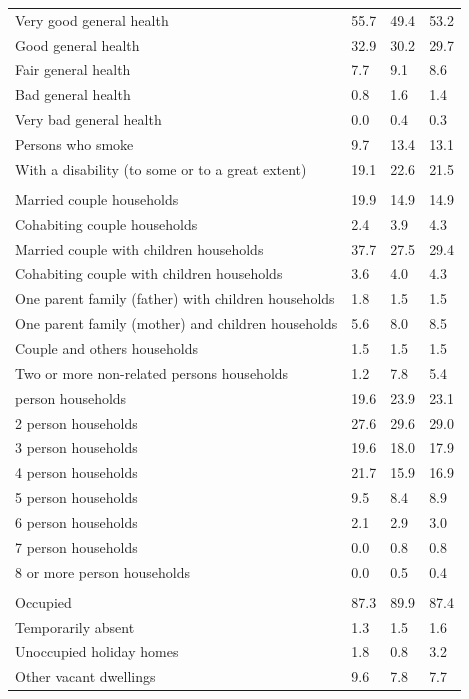 \documentclass{article}
\begin{document}
\begin{table}[h]
\begin{tabular}{KTTT}
Very good general health & 55.7& 49.4& 53.2\\
Good general health & 32.9& 30.2& 29.7\\
Fair general health & 7.7& 9.1& 8.6\\
Bad general health & 0.8& 1.6& 1.4\\
Very bad general health & 0.0& 0.4& 0.3\\
    \hline
Persons who smoke &  9.7& 13.4& 13.1\\
    \hline
With a disability (to some or to a great extent) & 19.1& 22.6& 21.5\\
\hline
    \\ 
    \hline
Married couple households & 19.9& 14.9& 14.9\\
Cohabiting couple households & 2.4& 3.9& 4.3\\
Married couple with children households & 37.7& 27.5& 29.4\\
Cohabiting couple with children households & 3.6& 4.0& 4.3\\
One parent family (father) with  children households & 1.8& 1.5& 1.5\\
One parent family (mother) and children households & 5.6& 8.0& 8.5\\
Couple and others households  & 1.5& 1.5& 1.5\\
Two or more non-related persons households & 1.2& 7.8& 5.4\\
     person households & 19.6& 23.9& 23.1\\
2 person households & 27.6& 29.6& 29.0\\
3 person households & 19.6& 18.0& 17.9\\
4 person households & 21.7& 15.9& 16.9\\
5 person households & 9.5& 8.4& 8.9\\
6 person households & 2.1& 2.9& 3.0\\
7 person households & 0.0& 0.8& 0.8\\
8 or more person households & 0.0& 0.5& 0.4\\
\hline
    \\ 
    \hline
Occupied & 87.3& 89.9& 87.4\\
Temporarily absent & 1.3& 1.5& 1.6\\
Unoccupied holiday homes & 1.8& 0.8& 3.2\\
Other vacant dwellings & 9.6& 7.8& 7.7\\
\hline
\end{tabular}
\end{table}
\end{document}
